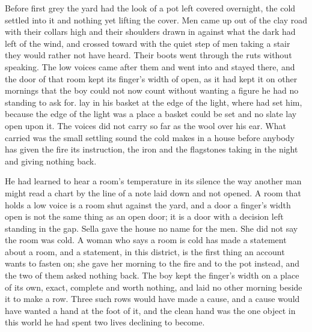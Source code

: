 
Before first grey the yard had the look of a pot left covered overnight, the cold settled into it and nothing yet lifting the cover. Men came up out of the clay road with their collars high and their shoulders drawn in against what the dark had left of the wind, and crossed  toward  with the quiet step of men taking a stair they would rather not have heard. Their boots went through the ruts without speaking. The low voices came after them and went into  and stayed there, and the door of that room kept its finger's width of open, as it had kept it on other mornings that the boy could not now count without wanting a figure he had no standing to ask for.  lay in his basket at the edge of the light, where  had set him, because the edge of the light was a place a basket could be set and no slate lay open upon it. The voices did not carry so far as the wool over his ear. What carried was the small settling sound the cold makes in a house before anybody has given the fire its instruction, the iron and the flagstones taking in the night and giving nothing back.

He had learned to hear a room's temperature in its silence the way another man might read a chart by the line of a note laid down and not opened. A room that holds a low voice is a room shut against the yard, and a door a finger's width open is not the same thing as an open door; it is a door with a decision left standing in the gap. Sella gave the house no name for the men. She did not say the room was cold. A woman who says a room is cold has made a statement about a room, and a statement, in this district, is the first thing an account wants to fasten on; she gave her morning to the fire and to the pot instead, and the two of them asked nothing back. The boy kept the finger's width on a place of its own, exact, complete and worth nothing, and laid no other morning beside it to make a row. Three such rows would have made a cause, and a cause would have wanted a hand at the foot of it, and the clean hand was the one object in this world he had spent two lives declining to become.


